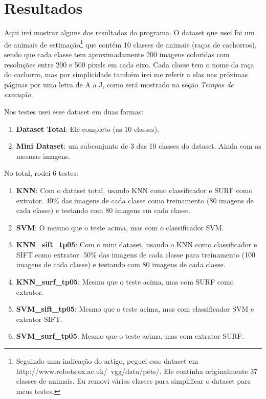 \section{Resultados}
Aqui irei mostrar alguns dos resultados do programa. O dataset que usei foi um de
animais de estimação\footnote{
Seguindo uma indicação do artigo, peguei esse dataset em http://www.robots.ox.ac.uk/~vgg/data/pets/.
Ele continha originalmente 37 classes de animais. Eu removi várias classes para simplificar o dataset
para meus testes.
} que contém 10 classes de animais (raças de cachorros),
sendo que cada classe tem aproximadamente 200 imagens coloridas com resoluções entre
200 e 500 pixels em cada eixo. Cada classe tem o nome da raça do cachorro, mas por simplicidade 
também irei me referir a elas nas próximas páginas por uma letra de A a J, como será mostrado na seção \emph{Tempos de execução}.

Nos testes usei esse dataset em duas formas:
\begin{enumerate}
  \item \textbf{Dataset Total}: Ele completo (as 10 classes).
  \item \textbf{Mini Dataset}: um subconjunto de 3 das 10 classes do dataset. Ainda com as mesmas imagens.
\end{enumerate}

No total, rodei 6 testes:
\begin{enumerate}
  \item \textbf{KNN}: Com o dataset total, usando KNN como classificador e SURF como extrator. 40\% das
    imagens de cada classe como treinamento (80 imagens de cada classe) e testando com 80 imagens em cada classe.
  \item \textbf{SVM}: O mesmo que o teste acima, mas com o classificador SVM.
  \item \textbf{KNN\_sift\_tp05}: Com o mini dataset, usando o KNN como classificador e SIFT como extrator.
    50\% das imagens de cada classe para treinamento (100 imagens de cada classe) e testando com 80
    imagens de cada classe.
  \item \textbf{KNN\_surf\_tp05}: Mesmo que o teste acima, mas com SURF como extrator.
  \item \textbf{SVM\_sift\_tp05}: Mesmo que o teste acima, mas com classificador SVM e extrator SIFT.
  \item \textbf{SVM\_surf\_tp05}: Mesmo que o teste acima, mas com extrator SURF.
\end{enumerate}

